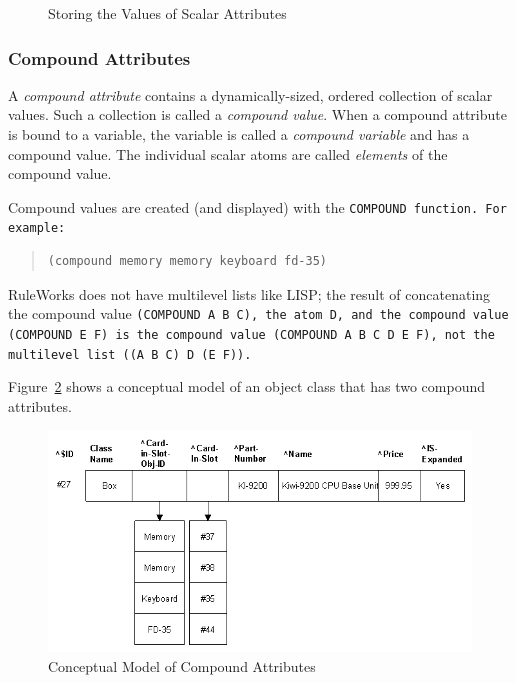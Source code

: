 \begin{figure}[h]
  \centering
  
  \caption{Storing the Values of Scalar Attributes}
  \label{f:2-5}
\end{figure}

\subsubsection*{Compound Attributes}

A \emph{compound attribute} contains a dynamically-sized, ordered
collection of scalar values. Such a collection is called a
\emph{compound value}. When a compound attribute is bound to a
variable, the variable is called a \emph{compound variable} and has a
compound value. The individual scalar atoms are called \emph{elements}
of the compound value.

Compound values are created (and displayed) with the \tt{COMPOUND}
function. For example:

\begin{quote}
\begin{verbatim}
(compound memory memory keyboard fd-35)
\end{verbatim}
\end{quote}

RuleWorks does not have multilevel lists like LISP; the
result of concatenating the compound value \tt{(COMPOUND A B C)},
the atom \tt{D}, and the compound value \tt{(COMPOUND E F)} is the
compound value \tt{(COMPOUND A B C D E F)}, not the multilevel
list \tt{((A B C) D (E F))}.

Figure~\ref{f:2-6} shows a conceptual model of an object class that
has two compound attributes.

\begin{figure}[h]
  \centering
  \includegraphics[scale=0.7]{f2-6}
  \caption{Conceptual Model of Compound Attributes}
  \label{f:2-6}
\end{figure}

